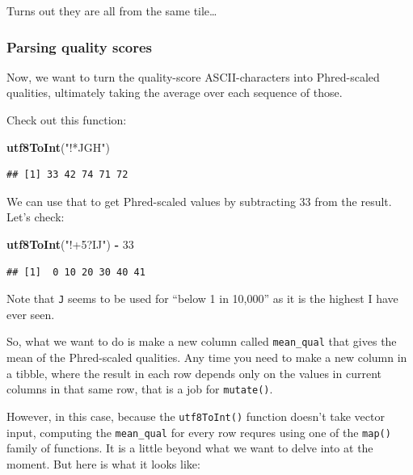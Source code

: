 \documentclass[]{krantz}
\makeatletter
\newenvironment{Shaded}{\begin{snugshade}}{\end{snugshade}}
\newcommand{\DecValTok}[1]{\textcolor[rgb]{0.06,0.06,0.06}{#1}}
\newcommand{\KeywordTok}[1]{\textcolor[rgb]{0.27,0.27,0.27}{\textbf{#1}}}
\newcommand{\NormalTok}[1]{#1}
\newcommand{\OperatorTok}[1]{\textcolor[rgb]{0.43,0.43,0.43}{\textbf{#1}}}
\newcommand{\StringTok}[1]{\textcolor[rgb]{0.5,0.5,0.5}{#1}}
\newenvironment{kframe}{%
\medskip{}
\setlength{\fboxsep}{.8em}
 \def\at@end@of@kframe{}%
 \ifinner\ifhmode%
  \def\at@end@of@kframe{\end{minipage}}%
  \begin{minipage}{\columnwidth}%
 \fi\fi%
 \def\FrameCommand##1{\hskip\@totalleftmargin \hskip-\fboxsep
 \colorbox{shadecolor}{##1}\hskip-\fboxsep
     \hskip-\linewidth \hskip-\@totalleftmargin \hskip\columnwidth}%
 \MakeFramed {\advance\hsize-\width
   \@totalleftmargin\z@ \linewidth\hsize
   \@setminipage}}%
 {\par\unskip\endMakeFramed%
 \at@end@of@kframe}
\renewenvironment{Shaded}{\begin{kframe}}{\end{kframe}}
\makeatother
\begin{document}
Turns out they are all from the same tile\ldots{}

\hypertarget{parsing-quality-scores}{%
\subsubsection{Parsing quality scores}\label{parsing-quality-scores}}

Now, we want to turn the quality-score ASCII-characters into Phred-scaled
qualities, ultimately taking the average over each sequence of those.

Check out this function:

\begin{Shaded}
\begin{Highlighting}[]
\KeywordTok{utf8ToInt}\NormalTok{(}\StringTok{"!*JGH"}\NormalTok{)}
\end{Highlighting}
\end{Shaded}

\begin{verbatim}
## [1] 33 42 74 71 72
\end{verbatim}

We can use that to get Phred-scaled values by subtracting 33 from the result. Let's check:

\begin{Shaded}
\begin{Highlighting}[]
\KeywordTok{utf8ToInt}\NormalTok{(}\StringTok{"!+5?IJ"}\NormalTok{) }\OperatorTok{-}\StringTok{ }\DecValTok{33}
\end{Highlighting}
\end{Shaded}

\begin{verbatim}
## [1]  0 10 20 30 40 41
\end{verbatim}

Note that \texttt{J} seems to be used for ``below 1 in 10,000'' as it is the highest I have ever seen.

So, what we want to do is make a new column called \texttt{mean\_qual} that gives the
mean of the Phred-scaled qualities. Any time you need to make a new column in a
tibble, where the result in each row depends only on the values in current columns
in that same row, that is a job for \texttt{mutate()}.

However, in this case, because the \texttt{utf8ToInt()} function doesn't take vector input,
computing the \texttt{mean\_qual} for every row requres using one of the \texttt{map()} family of functions.
It is a little beyond
what we want to delve into at the moment. But here is what it looks like:
\end{document}
